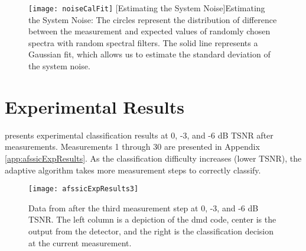 \begin{figure}[h]
	\texttt{[image: noiseCalFit]}
	\centering
	[Estimating the System Noise]{Estimating the System Noise: The circles represent the distribution of difference between the measurement and expected values of randomly chosen spectra with random spectral filters. The solid line represents a Gaussian fit, which allows us to estimate the standard deviation of the system noise.}
	\label{fig:noiseCalFit}
\end{figure}

\section{Experimental Results}


 presents experimental classification results at 0, -3, and -6 dB TSNR after measurements. Measurements 1 through 30 are presented in Appendix \ref{app:afssicExpResults}. As the classification difficulty increases (lower TSNR), the adaptive algorithm takes more measurement steps to correctly classify. 

 \begin{figure}[htb]
  \centering
  \texttt{[image: afssicExpResults3]}\\
  \caption{Data from after the third measurement step at 0, -3, and -6 dB TSNR. The left column is a depiction of the \gls{dmd} code, center is the output from the detector, and the right is the classification decision at the current measurement.}\label{fig:afssicExpResults3InChap}
\end{figure}

